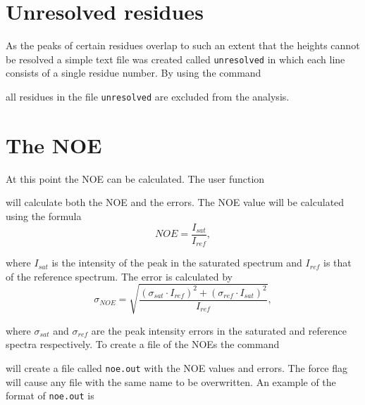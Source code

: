 
\section{Unresolved residues}

As the peaks of certain residues overlap to such an extent that the heights cannot be resolved a simple text file was created called \texttt{unresolved} in which each line consists of a single residue number.  By using the command


all residues in the file \texttt{unresolved} are excluded from the analysis.




\section{The NOE}

At this point the NOE can be calculated.  The user function


will calculate both the NOE and the errors.  The NOE value will be calculated using the formula
\begin{equation}
NOE = \frac{I_{sat}}{I_{ref}},
\end{equation}

\noindent where $I_{sat}$ is the intensity of the peak in the saturated spectrum and $I_{ref}$ is that of the reference spectrum.  The error is calculated by
\begin{equation}
\sigma_{NOE} = \sqrt{\frac{(\sigma_{sat} \cdot I_{ref})^2 + (\sigma_{ref} \cdot I_{sat})^2}{I_{ref}}},
\end{equation}

\noindent where $\sigma_{sat}$ and $\sigma_{ref}$ are the peak intensity errors in the saturated and reference spectra respectively.  To create a file of the NOEs the command


will create a file called \texttt{noe.out} with the NOE values and errors.  The force flag will cause any file with the same name to be overwritten.  An example of the format of \texttt{noe.out} is

